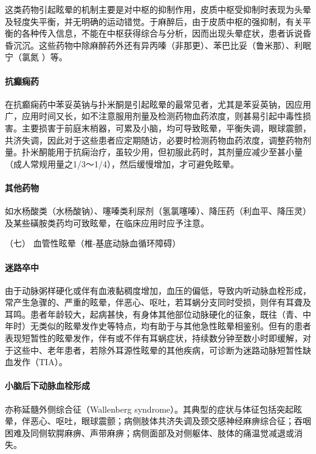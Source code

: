 这类药物引起眩晕的机制主要是对中枢的抑制作用，皮质中枢受抑制时表现为头晕及轻度失平衡，并无明确的运动错觉。于麻醉后，由于皮质中枢的强抑制，有关平衡的各种传入信息，不能在中枢获得综合与分析，因而出现头晕症状，患者诉说昏昏沉沉。这些药物中除麻醉药外还有异丙嗪（非那更）、苯巴比妥（鲁米那）、利眠宁（氯氮{}
）等。

\paragraph{抗癫痫药}

在抗癫痫药中苯妥英钠与扑米酮是引起眩晕的最常见者，尤其是苯妥英钠，因应用广，应用时间又长，如不注意服用剂量及检测药物血药浓度，则甚易引起中毒性损害。主要损害于前庭末梢器，可累及小脑，均可导致眩晕，平衡失调，眼球震颤，共济失调，因此对于这些患者应定期随访，必要时检测药物血药浓度，调整药物剂量。扑米酮能用于抗痫治疗，虽较少用，但初服此药时，其剂量应减少至甚小量（成人常规用量之1/3～1/4），然后缓慢增加，才可避免眩晕。

\paragraph{其他药物}

如水杨酸类（水杨酸钠）、噻嗪类利尿剂（氢氯噻嗪）、降压药（利血平、降压灵）及某些磺胺类药均可致眩晕，在临床应用时应予注意。

\hypertarget{text00012.htmlux5cux23CHP1-3-2-6-7}{}
（七） 血管性眩晕（椎-基底动脉血循环障碍）

\paragraph{迷路卒中}

由于动脉粥样硬化或伴有血液黏稠度增加，血压的偏低，导致内听动脉血栓形成，常产生急骤的、严重的眩晕，伴恶心、呕吐，若耳蜗分支同时受损，则伴有耳聋及耳鸣。患者年龄较大，起病甚快，有身体其他部位动脉硬化的征象，既往（青、中年时）无类似的眩晕发作史等特点，均有助于与其他急性眩晕相鉴别。但有的患者表现短暂性的眩晕发作，伴有或不伴有耳蜗症状，持续数分钟至数小时即缓解，对于这些中、老年患者，若除外耳源性眩晕的其他疾病，可诊断为迷路动脉短暂性缺血发作（TIA）。

\paragraph{小脑后下动脉血栓形成}

亦称延髓外侧综合征（Wallenberg
syndrome）。其典型的症状与体征包括突起眩晕，伴恶心、呕吐，眼球震颤；病侧肢体共济失调及颈交感神经麻痹综合征；吞咽困难及同侧软腭麻痹、声带麻痹；病侧面部及对侧躯体、肢体的痛温觉减退或消失。

